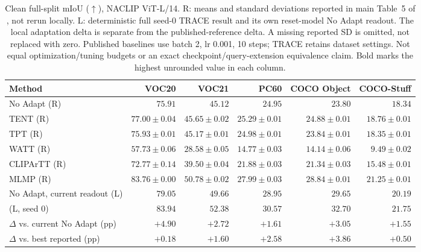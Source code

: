 \begin{table}[t]
\caption{Clean full-split mIoU ($\uparrow$), NACLIP ViT-L/14. R: means and standard deviations reported in main Table~5 of \citet{noori2025mlmp}, not rerun locally. L: deterministic full seed-0 TRACE result and its own reset-model No Adapt readout. The local adaptation delta is separate from the published-reference delta. A missing reported SD is omitted, not replaced with zero. Published baselines use batch 2, lr 0.001, 10 steps; TRACE retains dataset settings. Not equal optimization/tuning budgets or an exact checkpoint/query-extension equivalence claim. Bold marks the highest unrounded value in each column.}
\label{tab:reported}
\centering\small
\begin{tabular}{@{}lrrrrr@{}}
\toprule
Method & VOC20 & VOC21 & PC60 & COCO Object & COCO-Stuff \\
\midrule
No Adapt (R) & $75.91$ & $45.12$ & $24.95$ & $23.80$ & $18.34$ \\
TENT (R) & $77.00\pm0.04$ & $45.65\pm0.02$ & $25.29\pm0.01$ & $24.88\pm0.01$ & $18.76\pm0.01$ \\
TPT (R) & $75.93\pm0.01$ & $45.17\pm0.01$ & $24.98\pm0.01$ & $23.84\pm0.01$ & $18.35\pm0.01$ \\
WATT (R) & $57.73\pm0.06$ & $28.58\pm0.05$ & $14.77\pm0.03$ & $14.14\pm0.06$ & $9.49\pm0.02$ \\
CLIPArTT (R) & $72.77\pm0.14$ & $39.50\pm0.04$ & $21.88\pm0.03$ & $21.34\pm0.03$ & $15.48\pm0.01$ \\
MLMP (R) & $83.76\pm0.00$ & $50.78\pm0.02$ & $27.99\pm0.03$ & $28.84\pm0.01$ & $21.25\pm0.01$ \\
\midrule
No Adapt, current readout (L) & $79.05$ & $49.66$ & $28.95$ & $29.65$ & $20.19$ \\
\method{} (L, seed 0) & $\mathbf{83.94}$ & $\mathbf{52.38}$ & $\mathbf{30.57}$ & $\mathbf{32.70}$ & $\mathbf{21.75}$ \\
$\Delta$ vs. current No Adapt (pp) & $+4.90$ & $+2.72$ & $+1.61$ & $+3.05$ & $+1.55$ \\
$\Delta$ vs. best reported (pp) & $+0.18$ & $+1.60$ & $+2.58$ & $+3.86$ & $+0.50$ \\
\bottomrule
\end{tabular}
\end{table}

